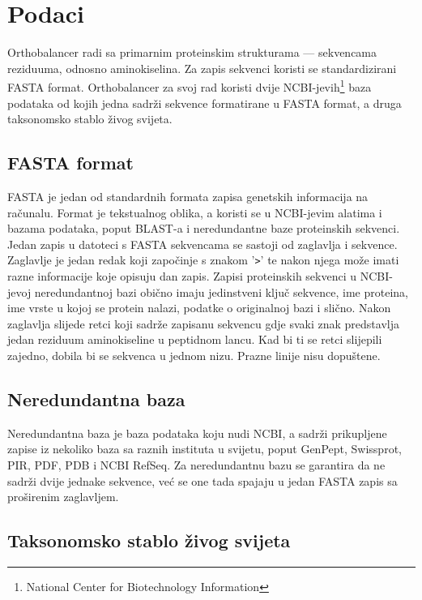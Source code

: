 \chapter{Podaci}
\label{chap:podaci}

Orthobalancer radi sa primarnim proteinskim strukturama --- sekvencama
reziduuma, odnosno aminokiselina. Za zapis sekvenci koristi se standardizirani
FASTA format. Orthobalancer za svoj rad koristi dvije
NCBI-jevih\footnote{National Center for Biotechnology Information} baza
podataka od kojih jedna sadrži sekvence formatirane u FASTA format, a druga
taksonomsko stablo živog svijeta.


\section{FASTA format}
\label{sec:fasta}

FASTA je jedan od standardnih formata zapisa genetskih informacija na računalu.
Format je tekstualnog oblika, a koristi se u NCBI-jevim alatima i bazama
podataka, poput BLAST-a i neredundantne baze proteinskih sekvenci. Jedan zapis u
datoteci s FASTA sekvencama se sastoji od zaglavlja i sekvence. Zaglavlje je
jedan redak koji započinje s znakom '\texttt{>}' te nakon njega može imati razne
informacije koje opisuju dan zapis. Zapisi proteinskih sekvenci u NCBI-jevoj
neredundantnoj bazi obično imaju jedinstveni ključ sekvence, ime proteina, ime
vrste u kojoj se protein nalazi, podatke o originalnoj bazi i slično. Nakon
zaglavlja slijede retci koji sadrže zapisanu sekvencu gdje svaki znak
predstavlja jedan reziduum aminokiseline u peptidnom lancu. Kad bi ti se retci
slijepili zajedno, dobila bi se sekvenca u jednom nizu. Prazne linije nisu
dopuštene.


\section{Neredundantna baza}
\label{sec:nrdb}

Neredundantna baza je baza podataka koju nudi NCBI, a sadrži prikupljene zapise
iz nekoliko baza sa raznih instituta u svijetu, poput GenPept, Swissprot, PIR,
PDF, PDB i NCBI RefSeq. Za neredundantnu bazu se garantira da ne sadrži dvije
jednake sekvence, već se one tada spajaju u jedan FASTA zapis sa proširenim
zaglavljem.


\section{Taksonomsko stablo živog svijeta}
\label{sec:taxdb}

